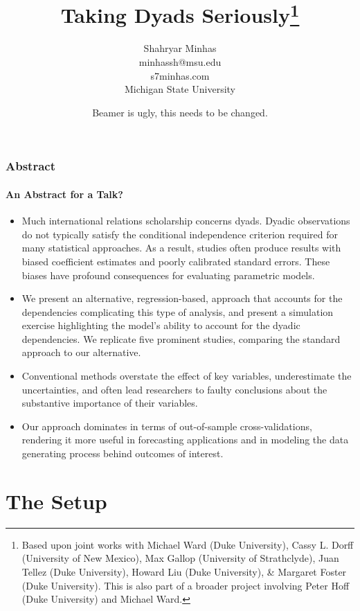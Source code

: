 \documentclass[10pt, compress]{beamer}
\title[AMEN]{Taking Dyads Seriously\thanks{Based upon joint works with Michael Ward (Duke University), Cassy L. Dorff (University of New Mexico), Max Gallop (University of Strathclyde), Juan Tellez (Duke University), Howard Liu (Duke University), \& Margaret Foster (Duke University). This is also part of a broader project involving Peter Hoff (Duke University) and Michael Ward.}
}
\author 
{Shahryar Minhas\\ minhassh@msu.edu \\ s7minhas.com \\
Michigan State University}
\date{Beamer is ugly, this needs to be changed.}
\begin{document}
\frame{\titlepage}


\begin{frame}
\frametitle{Abstract}
\framesubtitle{An Abstract for a Talk?}
\begin{itemize}
\item Much international relations scholarship concerns dyads. Dyadic observations do not typically satisfy the conditional independence criterion required for many statistical approaches. As a result, studies often produce results with biased coefficient estimates and poorly calibrated standard errors. These biases have profound consequences for evaluating parametric models. 

\item We present an alternative, regression-based, approach that accounts for the dependencies complicating this type of analysis, and present a simulation exercise highlighting the model's ability to account for the dyadic dependencies. We replicate five prominent studies, comparing the standard approach to our alternative. 

\item Conventional methods overstate the effect of key variables, underestimate the uncertainties, and often lead researchers to faulty conclusions about the substantive importance of their variables. 

\item Our approach dominates in terms of out-of-sample cross-validations, rendering it more useful in forecasting applications and in modeling the data generating process behind outcomes of interest.
\end{itemize}
\end{frame}

\section{The Setup}
\end{document}

